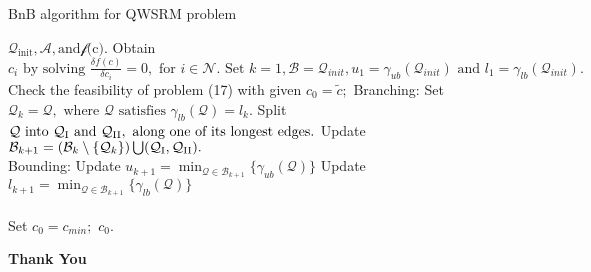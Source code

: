 \documentclass[usenames,dvipsnames]{beamer}
\begin{document}
\begin{frame}[fragile]
  \footnotesize
    \begin{block}{BnB algorithm for QWSRM problem}
        \begin{algorithmic}

	  \Input $\mathcal{Q}_{\text{init}}, \mathcal{A}, \text{and} \mathcal{f} \text{(c)}.$
	  \Initialize Obtain $c_{i} \text{ by solving } \frac{\delta f(c)}{\delta c_{i}}=0, \text{ for } i\in\mathcal{N}.\text{ Set } k = 1, \mathcal{B} = \mathcal{Q}_{init},u_{1}=\gamma_{ub}(\mathcal{Q}_{init}) \text{ and } l_{1} = \gamma_{lb}(\mathcal{Q}_{init}).$\\
	  Check the feasibility of problem (17) with given
	  \State $c_{0} = \widetilde{c};$
	  \Else
	  \State Branching:
\State\quad{} Set $\mathcal{Q}_{k} = \mathcal{Q}, \text{ where } \mathcal{Q} \text{ satisfies } \gamma_{lb}(\mathcal{Q}) = l_{k}.$
	  \State\quad{} Split $\mathcal{Q} \text{ into } \mathcal{Q}_{\rm{I}} \text{ and } \mathcal{Q}_{\rm{II}}, \text{ along one of its longest edges.}$
	     \State\quad{} Update $\mathcal{B}_{k+1} = (\mathcal{B}_{k}\setminus{\{\mathcal{Q}_{k}\}})\bigcup(\mathcal{Q}_{\rm{I}}, \mathcal{Q}_{\rm{II}}).$\\
	  \State Bounding:
	    \State\quad{} Update $u_{k+1} = \min_{\mathcal{Q}\in\mathcal{B}_{k+1}}{\{\gamma_{ub}(\mathcal{Q})}\}$
\State\quad{} Update $l_{k+1} = \min_{\mathcal{Q}\in\mathcal{B}_{k+1}}{\{\gamma_{lb}(\mathcal{Q})}\}$\\
	  \EndWhile\\
	  Set $c_{0} = c_{min};$
	  \EndIf
	  \Output $c_{0}.$
        \end{algorithmic}
    \end{block}
\end{frame}
\begin{frame}
  \color{Sepia}
  \centering \Huge\textbf{Thank You}
\end{frame}
\end{document}
